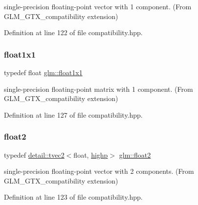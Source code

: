 single-\/precision floating-\/point vector with 1 component. (From G\+L\+M\+\_\+\+G\+T\+X\+\_\+compatibility extension) 



Definition at line 122 of file compatibility.\+hpp.

\mbox{\label{group__gtx__compatibility_gaac1faa940ac1fbb32d4a315005b578af}} 
\subsubsection{\texorpdfstring{float1x1}{float1x1}}
{\footnotesize\ttfamily typedef float \hyperlink{group__gtx__compatibility_gaac1faa940ac1fbb32d4a315005b578af}{glm\+::float1x1}}



single-\/precision floating-\/point matrix with 1 component. (From G\+L\+M\+\_\+\+G\+T\+X\+\_\+compatibility extension) 



Definition at line 127 of file compatibility.\+hpp.

\mbox{\label{group__gtx__compatibility_ga6ab0b791bbb15ef51a0e930a8710e6b1}} 
\subsubsection{\texorpdfstring{float2}{float2}}
{\footnotesize\ttfamily typedef \hyperlink{structglm_1_1detail_1_1tvec2}{detail\+::tvec2}$<$float, \hyperlink{namespaceglm_a0f04f086094c747d227af4425893f545ac6f7eab42eacbb10d59a58e95e362074}{highp}$>$ \hyperlink{group__gtx__compatibility_ga6ab0b791bbb15ef51a0e930a8710e6b1}{glm\+::float2}}



single-\/precision floating-\/point vector with 2 components. (From G\+L\+M\+\_\+\+G\+T\+X\+\_\+compatibility extension) 



Definition at line 123 of file compatibility.\+hpp.

